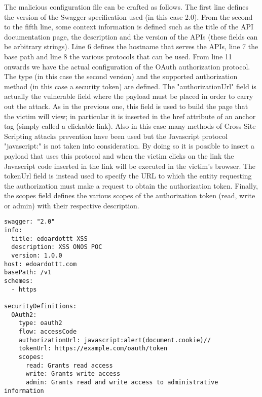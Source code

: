 The malicious configuration file can be crafted as follows. The first line defines the version of the Swagger specification used (in this case 2.0). From the second to the fifth line, some context information is defined such as the title of the API documentation page, the description and the version of the APIs (these fields can be arbitrary strings). Line 6 defines the hostname that serves the APIs, line 7 the base path and line 8 the various protocols that can be used. From line 11 onwards we have the actual configuration of the OAuth authorization protocol. The type (in this case the second version) and the supported authorization method (in this case a security token) are defined. The "authorizationUrl" field is actually the vulnerable field where the payload must be placed in order to carry out the attack. As in the previous one, this field is used to build the page that the victim will view; in particular it is inserted in the href attribute of an anchor tag (simply called a clickable link). Also in this case many methods of Cross Site Scripting attacks prevention have been used but the Javascript protocol "javascript:" is not taken into consideration. By doing so it is possible to insert a payload that uses this protocol and when the victim clicks on the link the Javascript code inserted in the link will be executed in the victim's browser. The tokenUrl field is instead used to specify the URL to which the entity requesting the authorization must make a request to obtain the authorization token. Finally, the scopes field defines the various scopes of the authorization token (read, write or admin) with their respective description.
\begin{lstlisting}
swagger: "2.0"
info:
  title: edoardottt XSS
  description: XSS ONOS POC
  version: 1.0.0
host: edoardottt.com
basePath: /v1
schemes:
  - https

securityDefinitions:
  OAuth2:
    type: oauth2
    flow: accessCode
    authorizationUrl: javascript:alert(document.cookie)//
    tokenUrl: https://example.com/oauth/token
    scopes:
      read: Grants read access
      write: Grants write access
      admin: Grants read and write access to administrative information
\end{lstlisting}

